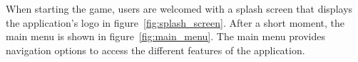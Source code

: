 When starting the game, users are welcomed with a splash screen that displays the application's logo in figure~\ref{fig:splash_screen}. After a short moment, the main menu is shown in figure~\ref{fig:main_menu}. The main menu provides navigation options to access the different features of the application.
\begin{figure}[ht!]
    \centering
    \begin{subfigure}[b]{0.27\textwidth}
        \centering

\end{subfigure}
\end{figure}
